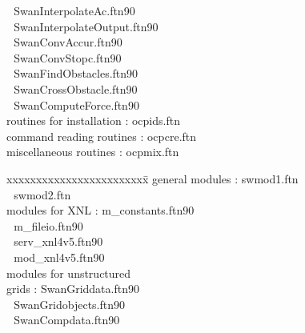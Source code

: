 \documentclass[12pt]{book}
\begin{document}
\begin{tabbing}
                          \> $\,\,$ SwanInterpolateAc.ftn90 \\
                          \> $\,\,$ SwanInterpolateOutput.ftn90 \\
                          \> $\,\,$ SwanConvAccur.ftn90 \\
                          \> $\,\,$ SwanConvStopc.ftn90 \\
                          \> $\,\,$ SwanFindObstacles.ftn90 \\
                          \> $\,\,$ SwanCrossObstacle.ftn90 \\
                          \> $\,\,$ SwanComputeForce.ftn90 \\
routines for installation \>:       ocpids.ftn \\
command reading routines  \>:       ocpcre.ftn \\
miscellaneous routines    \>:       ocpmix.ftn \\
\end{tabbing}
\newpage
\begin{tabbing}
xxxxxxxxxxxxxxxxxxxxxxxx\= \kill
general modules           \>:       swmod1.ftn \\
                          \> $\,\,$ swmod2.ftn \\
modules for XNL           \>:       m\_constants.ftn90 \\
                          \> $\,\,$ m\_fileio.ftn90 \\
                          \> $\,\,$ serv\_xnl4v5.ftn90 \\
                          \> $\,\,$ mod\_xnl4v5.ftn90 \\
modules for unstructured  \> $\,\,$ \\
grids                     \>:       SwanGriddata.ftn90 \\
                          \> $\,\,$ SwanGridobjects.ftn90 \\
                          \> $\,\,$ SwanCompdata.ftn90 \\
\end{tabbing}
\end{document}
